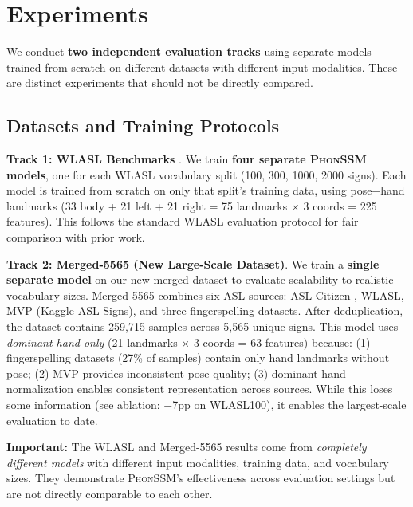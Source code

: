 \documentclass{article}
\theoremstyle{definition}
\theoremstyle{remark}
\newcommand{\phonssm}{\textsc{PhonSSM}}
\begin{document}
\section{Experiments}
\label{sec:experiments}

We conduct \textbf{two independent evaluation tracks} using separate models trained from scratch on different datasets with different input modalities. These are distinct experiments that should not be directly compared.

\subsection{Datasets and Training Protocols}

\textbf{Track 1: WLASL Benchmarks} \citep{li2020word}. We train \textbf{four separate \phonssm{} models}, one for each WLASL vocabulary split (100, 300, 1000, 2000 signs). Each model is trained from scratch on only that split's training data, using pose+hand landmarks (33 body + 21 left + 21 right = 75 landmarks $\times$ 3 coords = 225 features). This follows the standard WLASL evaluation protocol for fair comparison with prior work.

\textbf{Track 2: Merged-5565 (New Large-Scale Dataset)}. We train a \textbf{single separate model} on our new merged dataset to evaluate scalability to realistic vocabulary sizes. Merged-5565 combines six ASL sources: ASL Citizen \citep{desai2023asl}, WLASL, MVP (Kaggle ASL-Signs), and three fingerspelling datasets. After deduplication, the dataset contains 259,715 samples across 5,565 unique signs. This model uses \textit{dominant hand only} (21 landmarks $\times$ 3 coords = 63 features) because: (1) fingerspelling datasets (27\% of samples) contain only hand landmarks without pose; (2) MVP provides inconsistent pose quality; (3) dominant-hand normalization enables consistent representation across sources. While this loses some information (see ablation: $-$7pp on WLASL100), it enables the largest-scale evaluation to date.

\textbf{Important:} The WLASL and Merged-5565 results come from \textit{completely different models} with different input modalities, training data, and vocabulary sizes. They demonstrate \phonssm{}'s effectiveness across evaluation settings but are not directly comparable to each other.
\end{document}
